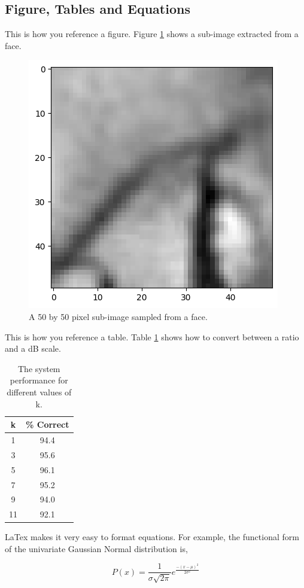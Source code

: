 \documentclass[a4paper]{article}
\begin{document}
\subsection{Figure, Tables and Equations}

This is how you reference a figure. Figure \ref{fig:face} shows a sub-image extracted from a face.

\begin{figure}[t]
    \centering
    \includegraphics[width=0.8\linewidth]{face50_1.png}
    \caption{A 50 by 50 pixel sub-image sampled from a face.}
    \label{fig:face}
  \end{figure}

This is how you reference a table. Table \ref{tab:example} shows how to convert between a ratio and a dB scale.
\begin{table}[th]
    \caption{The system performance for different values of k.}
    \label{tab:example}
    \centering
    \begin{tabular}{ c|c}
      \toprule
      k & \% Correct\\
      \midrule
       1 & 94.4 \\
       3 & 95.6 \\
       5 & 96.1 \\
       7 & 95.2 \\
       9 & 94.0 \\
       11 & 92.1 \\
      \bottomrule
    \end{tabular}

  \end{table}

  LaTex makes it very easy to format equations. For example, the functional form of the univariate Gaussian Normal distribution is,

  \begin{equation}
P(x) = \frac{1}{\sigma \sqrt {2\pi } }e^{\frac{ - \left( {x - \mu } \right)^2 }{2\sigma^2}}
\label{eq:gaussian}
  \end{equation}





\end{document}
